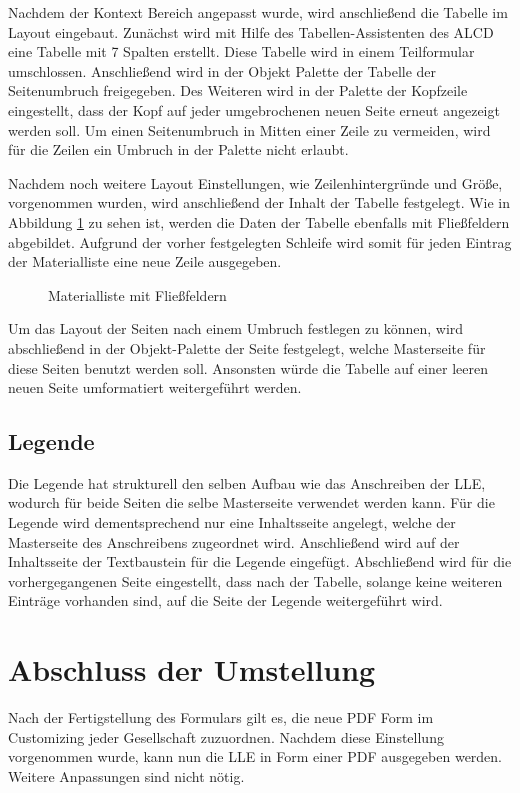 Nachdem der Kontext Bereich angepasst wurde, wird anschließend die Tabelle im Layout eingebaut. Zunächst wird mit Hilfe des Tabellen-Assistenten des \ac{ALCD} eine Tabelle mit 7 Spalten erstellt. Diese Tabelle wird in einem Teilformular umschlossen. Anschließend wird in der Objekt Palette der Tabelle der Seitenumbruch freigegeben. Des Weiteren wird in der Palette der Kopfzeile eingestellt, dass der Kopf auf jeder umgebrochenen neuen Seite erneut angezeigt werden soll. Um einen Seitenumbruch in Mitten einer Zeile zu vermeiden, wird für die Zeilen ein Umbruch in der Palette nicht erlaubt. 

Nachdem noch weitere Layout Einstellungen, wie Zeilenhintergründe und Größe, vorgenommen wurden, wird anschließend der Inhalt der Tabelle festgelegt. Wie in Abbildung \ref{figTab} zu sehen ist, werden die Daten der Tabelle ebenfalls mit Fließfeldern abgebildet. Aufgrund der vorher festgelegten Schleife wird somit für jeden Eintrag der Materialliste eine neue Zeile ausgegeben.

\begin{figure}[ht]
	\centering
	\caption{Materialliste mit Fließfeldern}
	\label{figTab}
	
\end{figure}

Um das Layout der Seiten nach einem Umbruch festlegen zu können, wird abschließend in der Objekt-Palette der Seite festgelegt, welche Masterseite für diese Seiten benutzt werden soll. Ansonsten würde die Tabelle auf einer leeren neuen Seite umformatiert weitergeführt werden.

\FloatBarrier
\subsection{Legende}

Die Legende hat strukturell den selben Aufbau wie das Anschreiben der \ac{LLE}, wodurch für beide Seiten die selbe Masterseite verwendet werden kann. Für die Legende wird dementsprechend nur eine Inhaltsseite angelegt, welche der Masterseite des Anschreibens zugeordnet wird. Anschließend wird auf der Inhaltsseite der Textbaustein für die Legende eingefügt. Abschließend wird für die vorhergegangenen Seite eingestellt, dass nach der Tabelle, solange keine weiteren Einträge vorhanden sind, auf die Seite der Legende weitergeführt wird.


\section{Abschluss der Umstellung}

Nach der Fertigstellung des Formulars gilt es, die neue PDF Form im Customizing jeder Gesellschaft zuzuordnen. Nachdem diese Einstellung vorgenommen wurde, kann nun die \ac{LLE} in Form einer PDF ausgegeben werden. Weitere Anpassungen sind nicht nötig.


